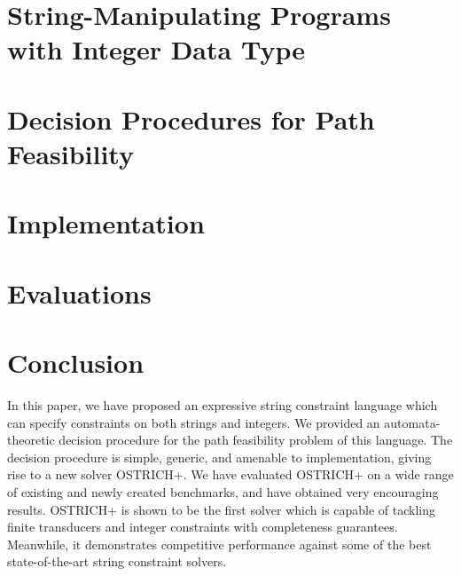 \documentclass{llncs}
\begin{document}



\section{String-Manipulating Programs with Integer Data Type}\label{sec:logic}





%


\section{Decision Procedures for Path Feasibility}\label{sec:dec}




\section{Implementation}




\section{Evaluations}



\section{Conclusion}

In this paper, we have proposed  an expressive string constraint language which can specify constraints on both strings and integers.  We provided an automata-theoretic decision procedure for the path feasibility problem of this language. The decision procedure is simple, generic, and amenable to implementation, giving rise to a new solver OSTRICH+.  We have evaluated OSTRICH+ on  a wide range of existing and newly created benchmarks, and have obtained very encouraging results. 
OSTRICH+ is shown to be the first solver  which is capable of tackling finite transducers and integer constraints with completeness guarantees. Meanwhile, it demonstrates competitive performance against some of the best state-of-the-art string constraint solvers.



\newpage 



%
%
%
\end{document}

